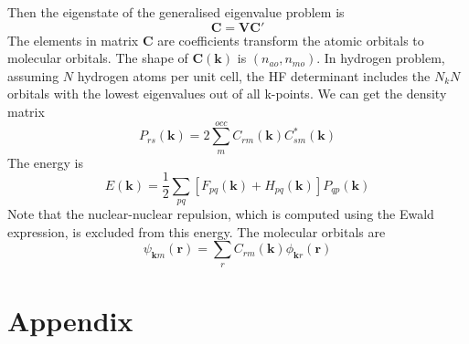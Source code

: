 \documentclass{article}
\begin{document}
        Then the eigenstate of the generalised eigenvalue problem is
        \begin{equation}
            \textbf{C} = \textbf{V}\textbf{C}'
        \end{equation}
        The elements in matrix $\textbf{C}$ are coefficients transform the atomic orbitals to molecular orbitals.
        The shape of $\textbf{C}(\textbf{k})$ is $(n_{ao}, n_{mo})$.
        In hydrogen problem, assuming $N$ hydrogen atoms per unit cell, 
        the HF determinant includes the $N_kN$ orbitals with the lowest eigenvalues out of all k-points.
        We can get the density matrix
        \begin{equation}
            P_{rs}(\textbf{k}) = 2\sum_m^{occ}C_{rm}(\textbf{k})C_{sm}^*(\textbf{k})
        \end{equation}
        The energy is
        \begin{equation}
            E(\textbf{k}) = \frac{1}{2}\sum_{pq}\left[F_{pq}(\textbf{k})+H_{pq}(\textbf{k})\right]P_{qp}(\textbf{k})
        \end{equation}
        Note that the nuclear-nuclear repulsion,
        which is computed using the Ewald expression, is excluded from this energy.
        The molecular orbitals are
        \begin{equation}
            \psi_{\textbf{k}m}(\textbf{r}) = \sum_{r}C_{rm}(\textbf{k})\phi_{\textbf{k}r}(\textbf{r})
        \end{equation} 





\section*{Appendix}
\end{document}
